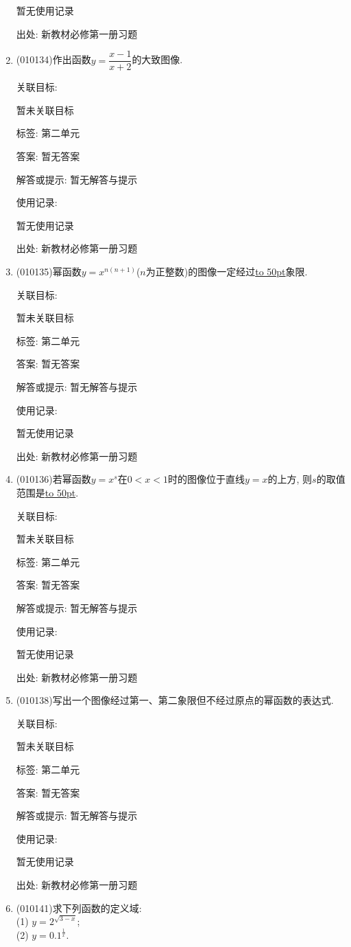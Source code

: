 \documentclass[10pt,a4paper]{article}
\newcommand{\blank}[1]{\underline{\hbox to #1pt{}}}
\begin{document}
\begin{enumerate}[1.]
暂无使用记录


出处: 新教材必修第一册习题
\item { (010134)}作出函数$y=\dfrac{x-1}{x+2}$的大致图像.


关联目标:

暂未关联目标



标签: 第二单元

答案: 暂无答案

解答或提示: 暂无解答与提示

使用记录:

暂无使用记录


出处: 新教材必修第一册习题
\item { (010135)}幂函数$y=x^{n(n+1)}$($n$为正整数)的图像一定经过\blank{50}象限.


关联目标:

暂未关联目标



标签: 第二单元

答案: 暂无答案

解答或提示: 暂无解答与提示

使用记录:

暂无使用记录


出处: 新教材必修第一册习题
\item { (010136)}若幂函数$y=x^s$在$0<x<1$时的图像位于直线$y=x$的上方, 则$s$的取值范围是\blank{50}.


关联目标:

暂未关联目标



标签: 第二单元

答案: 暂无答案

解答或提示: 暂无解答与提示

使用记录:

暂无使用记录


出处: 新教材必修第一册习题
\item { (010138)}写出一个图像经过第一、第二象限但不经过原点的幂函数的表达式.


关联目标:

暂未关联目标



标签: 第二单元

答案: 暂无答案

解答或提示: 暂无解答与提示

使用记录:

暂无使用记录


出处: 新教材必修第一册习题
\item { (010141)}求下列函数的定义域:\\
(1) $y=2^{\sqrt{3-x}}$;\\
(2) $y=0.1^\frac 1x$.



\end{enumerate}
\end{document}
